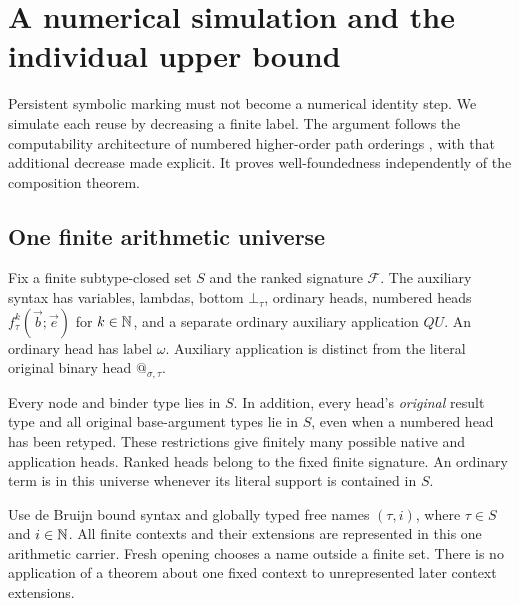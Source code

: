 \section{A numerical simulation and the individual upper bound}
\label{sec:upper}

Persistent symbolic marking must not become a numerical identity step.
We simulate each reuse by decreasing a finite label. The argument follows
the computability architecture of numbered higher-order path orderings
\cite[Section~5.3]{kop}, with that additional decrease made explicit.
It proves well-foundedness independently of the composition theorem.

\subsection{One finite arithmetic universe}
Fix a finite subtype-closed set $S$ and the ranked signature $\mathcal F$.
The auxiliary syntax has variables, lambdas, bottom $\bot_\tau$, ordinary
heads, numbered heads $f^k_\tau(\vec b;\vec e)$ for $k\in\mathbb N$, and a
separate ordinary auxiliary application $QU$. An ordinary head has label
$\omega$. Auxiliary application is distinct from the literal original
binary head $@_{\sigma,\tau}$.

Every node and binder type lies in $S$. In addition, every head's
\emph{original} result type and all original base-argument types lie in
$S$, even when a numbered head has been retyped. These restrictions give
finitely many possible native and application heads. Ranked heads belong
to the fixed finite signature. An ordinary term is in this universe
whenever its literal support is contained in $S$.

Use de Bruijn bound syntax and globally typed free names $(\tau,i)$,
where $\tau\in S$ and $i\in\mathbb N$. All finite contexts and their extensions
are represented in this one arithmetic carrier. Fresh opening chooses
a name outside a finite set. There is no application of a theorem about
one fixed context to unrepresented later context extensions.

